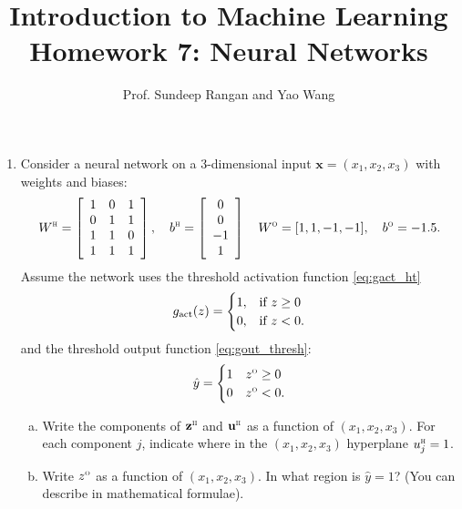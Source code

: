 \documentclass[11pt]{article}
\def\beq{\begin{equation}}
\def\eeq{\end{equation}}
\newcommand{\ubf}{\mathbf{u}}
\newcommand{\xbf}{\mathbf{x}}
\newcommand{\zbf}{\mathbf{z}}
\def\hid{\textsc{\tiny H}}
\def\out{\textsc{\tiny O}}
\begin{document}
\title{Introduction to Machine Learning\\
Homework 7:  Neural Networks}
\author{Prof. Sundeep Rangan and Yao Wang}
\date{}

\maketitle


\begin{enumerate}



\item Consider a neural network
on a 3-dimensional input $\xbf=(x_1,x_2, x_3)$ with weights and biases:
\[
    W^\hid = \left[ \begin{array}{ccc} 1 & 0 & 1  \\ 0 & 1  & 1 \\ 1 & 1 & 0 \\ 1 & 1 & 1\\ \end{array} \right], \quad
    b^\hid = \left[ \begin{array}{c} 0 \\ 0 \\ -1 \\ 1 \end{array} \right] \quad
    W^\out = [1, 1, -1, -1], \quad b^\out = -1.5.
\]
Assume the network uses the
threshold activation function \eqref{eq:gact_ht}
\beq \label{eq:gact_ht}
    g_{\rm act}(z) = \begin{cases}
        1, & \mbox{if } z \geq 0 \\
        0, & \mbox{if } z < 0.
        \end{cases}
\eeq
 and the
threshold output function \eqref{eq:gout_thresh}:
\beq \label{eq:gout_thresh}
    \hat{y} =  \begin{cases}
        1 & z^\out \geq 0 \\
        0 & z^\out < 0.
        \end{cases}
\eeq



\begin{enumerate}[(a)]
\item Write the components of $\zbf^\hid$ and $\ubf^\hid$ as a function
of $(x_1,x_2, x_3)$.  For each component $j$, indicate where in the $(x_1,x_2, x_3)$
hyperplane $u^\hid_j=1$.

\item Write $z^\out$ as a function of $(x_1,x_2, x_3)$.  In what region is
$\hat{y}=1$? (You can describe in mathematical formulae).
\end{enumerate}




\end{enumerate}
\end{document}
